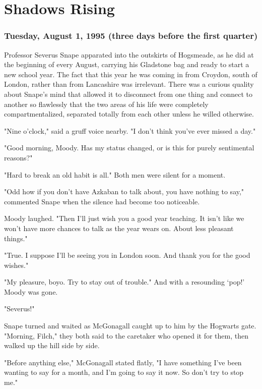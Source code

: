 
\chapter{Shadows Rising}

\subsection{Tuesday, August 1, 1995 (three days before the first quarter)}

Professor Severus Snape apparated into the outskirts of Hogsmeade, as he did at the beginning of every August, carrying his Gladstone bag and ready to start a new school year. The fact that this year he was coming in from Croydon, south of London, rather than from Lancashire was irrelevant. There was a curious quality about Snape's mind that allowed it to disconnect from one thing and connect to another so flawlessly that the two areas of his life were completely compartmentalized, separated totally from each other unless he willed otherwise.

"Nine o'clock," said a gruff voice nearby. "I don't think you've ever missed a day."

"Good morning, Moody. Has my status changed, or is this for purely sentimental reasons?"

"Hard to break an old habit is all." Both men were silent for a moment.

"Odd how if you don't have Azkaban to talk about, you have nothing to say," commented Snape when the silence had become too noticeable.

Moody laughed. "Then I'll just wish you a good year teaching. It isn't like we won't have more chances to talk as the year wears on. About less pleasant things."

"True. I suppose I'll be seeing you in London soon. And thank you for the good wishes."

"My pleasure, boyo. Try to stay out of trouble." And with a resounding `pop!' Moody was gone.

"Severus!"

Snape turned and waited as McGonagall caught up to him by the Hogwarts gate. "Morning, Filch," they both said to the caretaker who opened it for them, then walked up the hill side by side.

"Before anything else," McGonagall stated flatly, "I have something I've been wanting to say for a month, and I'm going to say it now. So don't try to stop me."

